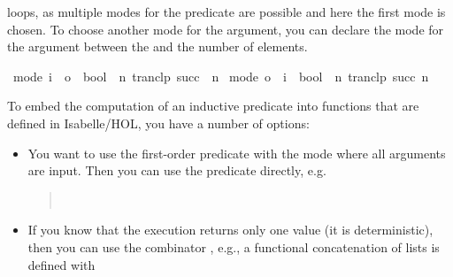 \begin{isabellebody}
\begin{isamarkuptext}
   loops, as multiple modes for the
  predicate  are possible and here the first mode  is chosen. To choose another mode for the argument,
  you can declare the mode for the argument between the \hyperlink{command.values}{\mbox{}} and the number of elements.%
\end{isamarkuptext}%
\isamarkuptrue%
%
\isadelimquote
%
\endisadelimquote
%
\isatagquote
{}\isamarkupfalse%
\ {\isacharbrackleft}mode{\isacharcolon}\ i\ {\isacharequal}{\isachargreater}\ o\ {\isacharequal}{\isachargreater}\ bool{\isacharbrackright}\ {}{}\ {\isachardoublequoteopen}{\isacharbraceleft}n{\isachardot}\ tranclp\ succ\ {}{}\ n{\isacharbraceright}{\isachardoublequoteclose}\isanewline
{}\isamarkupfalse%
\ {\isacharbrackleft}mode{\isacharcolon}\ o\ {\isacharequal}{\isachargreater}\ i\ {\isacharequal}{\isachargreater}\ bool{\isacharbrackright}\ {}{}\ {\isachardoublequoteopen}{\isacharbraceleft}n{\isachardot}\ tranclp\ succ\ n\ {}{}{\isacharbraceright}{\isachardoublequoteclose}%
\endisatagquote
{\isafoldquote}%
%
\isadelimquote
%
\endisadelimquote
%
\isamarkuptrue%
%
\begin{isamarkuptext}%
To embed the computation of an inductive predicate into functions
  that are defined in Isabelle/HOL, you have a number of options:

  \begin{itemize}

    \item You want to use the first-order predicate with the mode
      where all arguments are input. Then you can use the predicate directly, e.g.

      \begin{quote}
         \\
      \end{quote}

    \item If you know that the execution returns only one value (it is
      deterministic), then you can use the combinator , e.g., a functional concatenation of lists is
      defined with


\end{itemize}
\end{isamarkuptext}
\end{isabellebody}
